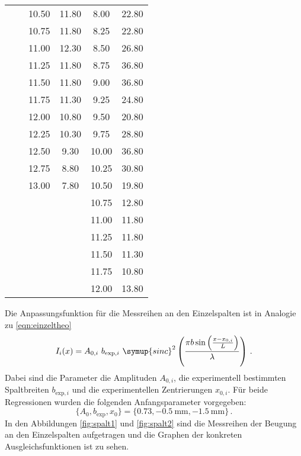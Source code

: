 \begin{longtable}{S[table-format=3.2] S[table-format=3.2] S[table-format=3.2] S[table-format=3.2] S[table-format=3.2] S[table-format=3.2]}
                     &     & 10.50 & 11.80 & 8.00 & 22.80\\
                     &     & 10.75 & 11.80 & 8.25 & 22.80\\
                     &     & 11.00 & 12.30 & 8.50 & 26.80\\
                     &     & 11.25 & 11.80 & 8.75 & 36.80\\
                     &     & 11.50 & 11.80 & 9.00 & 36.80\\
                     &     & 11.75 & 11.30 & 9.25 & 24.80\\
                     &     & 12.00 & 10.80 & 9.50 & 20.80\\
                     &     & 12.25 & 10.30 & 9.75 & 28.80\\
                     &     & 12.50 & 9.30 & 10.00 & 36.80\\
                     &     & 12.75 & 8.80 & 10.25 & 30.80\\
                     &     & 13.00 & 7.80 & 10.50 & 19.80\\
                     &     &    &  & 10.75 & 12.80\\
                     &     &    &  & 11.00 & 11.80\\
                     &     &    &  & 11.25 & 11.80\\
                     &     &    &  & 11.50 & 11.30\\
                     &     &    &  & 11.75 & 10.80\\
                     &     &    &  & 12.00 & 13.80\\
                \bottomrule
\end{longtable}

Die Anpassungsfunktion für die Messreihen an den Einzelspalten ist in Analogie zu
\eqref{eqn:einzeltheo}
\begin{equation}
  I_i (x) = A_{0,i} \,\, b_{\text{exp},i} \,\, \symup{sinc}^2\left(\frac{\pi b \sin\left(\frac{x-x_{0,i}}{L}\right)}{\lambda}\right) \,.
\end{equation}
Dabei sind die Parameter die Amplituden $A_{0,i}$, die experimentell bestimmten Spaltbreiten
$b_{\text{exp},i}$ und die experimentellen Zentrierungen $x_{0,i}$.
Für beide Regressionen wurden die folgenden Anfangsparameter vorgegeben:
\begin{equation}
  \{A_0, b_{\text{exp}}, x_0\} = \{0.73, \SI{-0.5}{\milli\meter}, \SI{-1.5}{\milli\meter}\}\,.
\end{equation}
In den Abbildungen \ref{fig:spalt1} und \ref{fig:spalt2} sind die Messreihen der Beugung an den Einzelspalten aufgetragen
und die Graphen der konkreten Ausgleichsfunktionen ist zu sehen.

